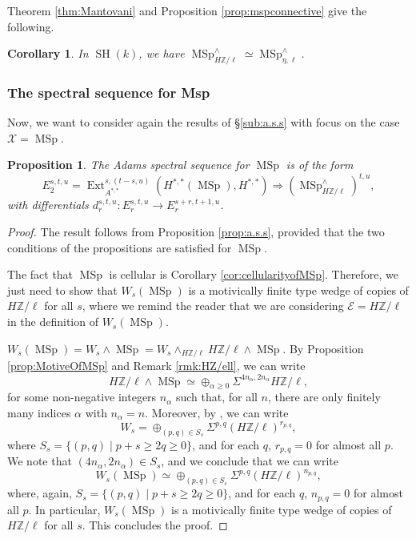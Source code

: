 \documentclass[10pt]{amsart}
\theoremstyle{definition}
\theoremstyle{plain}
\newtheorem{prop}[defn]{Proposition}
\newtheorem{corollary}[defn]{Corollary}
\numberwithin{equation}{section}
\newcommand{\0}{\emptyset}
\newcommand{\sE}{{\mathcal E}}
\newcommand{\sX}{{\mathcal X}}
\newcommand{\Z}{{\mathbb Z}}
\newcommand{\MSp}{{\operatorname{MSp}}}
\newcommand{\SH}{{\operatorname{SH}}}
\newcommand{\Ext}{{\operatorname{Ext}}}
\begin{document}
Theorem \ref{thm:Mantovani} and Proposition \ref{prop:mspconnective} give the following.

\begin{corollary}
\label{cor:EtaEllComplMSp}
    In $\SH(k)$, we have $\MSp_{H\Z/\ell}^\wedge \simeq \MSp_{\eta, \ell}^\wedge$.
\end{corollary}

\subsubsection{The spectral sequence for Msp}

Now, we want to consider again the results of \S \ref{sub:a.s.s} with focus on the case $\sX = \MSp$.

\begin{prop}
\label{prop: a.s.s.MSp}
    The Adams spectral sequence for $\MSp$ is of the form
    $$E_2^{s,t,u}= \Ext_{A^{*,*}}^{s,(t-s,u)}(H^{*,*}(\MSp),H^{*,*}) \Rightarrow (\MSp_{H\Z /\ell}^\wedge)^{t,u},$$
    with differentials $d_r^{s,t,u}:E_r^{s,t,u} \to E_r^{s+r,t+1,u}$.
\end{prop}

\begin{proof}
    The result follows from Proposition \ref{prop:a.s.s}, provided that the two conditions of the propositions are satisfied for $\MSp$.

    The fact that $\MSp$ is cellular is Corollary \ref{cor:cellularityofMSp}. Therefore, we just need to show that $W_s(\MSp)$ is a motivically finite type wedge of copies of $H\Z/\ell$ for all $s$, where we remind the reader that we are considering $\sE=H\Z/\ell$ in the definition of $W_s(\MSp)$.

    $W_s(\MSp)=W_s \wedge \MSp = W_s \wedge_{H\Z/\ell} H\Z/\ell \wedge \MSp$. By Proposition \ref{prop:MotiveOfMSp} and Remark \ref{rmk:HZ/ell}, we can write $$H\Z/\ell \wedge \MSp \simeq \oplus_{\alpha \ge 0} \Sigma^{4n_\alpha,2n_\alpha}H\Z/\ell,$$
    for some non-negative integers $n_\alpha$ such that, for all $n$, there are only finitely many indices $\alpha$ with $n_\alpha=n$. Moreover, by \cite[Lemma 6.8]{lev:ellcoh}, we can write
    $$W_s = \oplus_{(p,q) \in S_s}\Sigma^{p,q}(H\Z/\ell)^{r_{p,q}},$$
    where $S_s = \{(p,q) \mid p+s \ge 2q \ge0 \}$, and for each $q$, $r_{p,q}=0$ for almost all $p$. We note that $(4n_\alpha,2n_\alpha)\in S_s$, and we conclude that we can write
    $$W_s(\MSp) \simeq \oplus_{(p,q) \in S_s}\Sigma^{p,q}(H\Z/\ell)^{n_{p,q}},$$
    where, again, $S_s = \{(p,q) \mid p+s \ge 2q \ge0 \}$, and for each $q$, $n_{p,q}=0$ for almost all $p$. In particular, $W_s(\MSp)$ is a motivically finite type wedge of copies of $H\Z/\ell$ for all $s$. This concludes the proof.
\end{proof}
\end{document}
